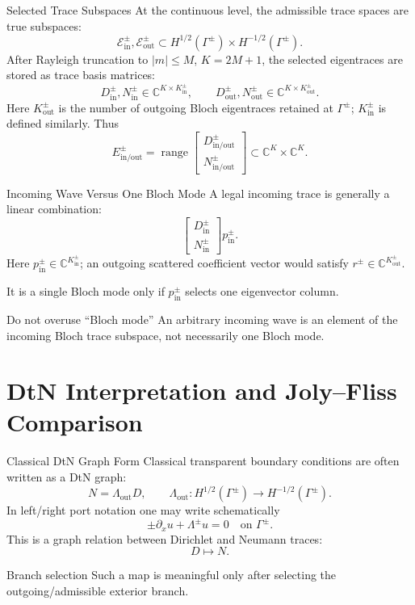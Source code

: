 \documentclass[aspectratio=169]{beamer}
\newcommand{\range}{\operatorname{range}}
\begin{document}
\begin{frame}{Selected Trace Subspaces}
  \small
  At the continuous level, the admissible trace spaces are true subspaces:
  \[
    \mathcal E_{\mathrm{in}}^\pm,
    \mathcal E_{\mathrm{out}}^\pm
    \subset
    H^{1/2}(\Gamma^\pm)\times H^{-1/2}(\Gamma^\pm).
  \]
  After Rayleigh truncation to \(|m|\le M\), \(K=2M+1\), the selected
  eigentraces are stored as trace basis matrices:
  \[
    D_{\mathrm{in}}^\pm,N_{\mathrm{in}}^\pm
    \in\mathbb C^{K\times K_{\mathrm{in}}^\pm},
    \qquad
    D_{\mathrm{out}}^\pm,N_{\mathrm{out}}^\pm
    \in\mathbb C^{K\times K_{\mathrm{out}}^\pm}.
  \]
  Here \(K_{\mathrm{out}}^\pm\) is the number of outgoing Bloch eigentraces
  retained at \(\Gamma^\pm\); \(K_{\mathrm{in}}^\pm\) is defined similarly.
  Thus
  \[
    E_{\mathrm{in/out}}^\pm
    =
    \range
    \begin{bmatrix}
      D_{\mathrm{in/out}}^\pm\\
      N_{\mathrm{in/out}}^\pm
    \end{bmatrix}
    \subset
    \mathbb C^K\times\mathbb C^K.
  \]
\end{frame}

\begin{frame}{Incoming Wave Versus One Bloch Mode}
  A legal incoming trace is generally a linear combination:
  \[
    \begin{bmatrix}
      D_{\mathrm{in}}^\pm\\
      N_{\mathrm{in}}^\pm
    \end{bmatrix}
    p_{\mathrm{in}}^\pm.
  \]
  Here \(p_{\mathrm{in}}^\pm\in\mathbb C^{K_{\mathrm{in}}^\pm}\); an outgoing
  scattered coefficient vector would satisfy
  \(r^\pm\in\mathbb C^{K_{\mathrm{out}}^\pm}\).

  It is a single Bloch mode only if \(p_{\mathrm{in}}^\pm\) selects one
  eigenvector column.
  \begin{block}{Do not overuse ``Bloch mode''}
    An arbitrary incoming wave is an element of the incoming Bloch trace
    subspace, not necessarily one Bloch mode.
  \end{block}
\end{frame}

\section{DtN Interpretation and Joly--Fliss Comparison}

\begin{frame}{Classical DtN Graph Form}
  Classical transparent boundary conditions are often written as a DtN graph:
  \[
    N=\Lambda_{\mathrm{out}}D,
    \qquad
    \Lambda_{\mathrm{out}}:
    H^{1/2}(\Gamma^\pm)\to H^{-1/2}(\Gamma^\pm).
  \]
  In left/right port notation one may write schematically
  \[
    \pm\partial_x u+\Lambda^\pm u=0
    \quad\text{on }\Gamma^\pm.
  \]
  This is a graph relation between Dirichlet and Neumann traces:
  \[
    D\mapsto N.
  \]
  \begin{alertblock}{Branch selection}
    Such a map is meaningful only after selecting the outgoing/admissible
    exterior branch.
  \end{alertblock}
\end{frame}
\end{document}
